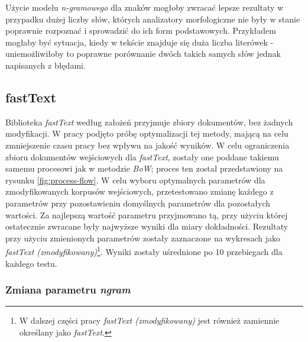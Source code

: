 Użycie modelu \textit{n-gramowego} dla znaków mogłoby zwracać lepsze rezultaty w przypadku dużej liczby słów, których analizatory morfologiczne nie były w stanie poprawnie rozpoznać i sprowadzić do ich form podstawowych. Przykładem mogłaby być sytuacja, kiedy w tekście znajduje się duża liczba literówek - uniemożliwiłoby to poprawne porównanie dwóch takich samych słów jednak napisanych z błędami.

\subsection{fastText}
Biblioteka \textit{fastText} według założeń przyjmuje zbiory dokumentów, bez żadnych modyfikacji. \cite{joulin2016fasttext} W pracy podjęto próbę optymalizacji tej metody, mającą na celu zmniejszenie czasu pracy bez wpływu na jakość wyników. W celu ograniczenia zbioru dokumentów wejściowych dla \textit{fastText}, zostały one poddane takiemu samemu procesowi jak w metodzie \textit{BoW}; proces ten został przedstawiony na rysunku \ref{fig:process-flow}. W celu wyboru optymalnych parametrów dla zmodyfikowanych korpusów wejściowych, przetestowano zmianę każdego z parametrów przy pozostawieniu domyślnych parametrów dla pozostałych wartości. Za najlepszą wartość parametru przyjmowano tą, przy użyciu której ostatecznie zwracane były najwyższe wyniki dla miary dokładności. Rezultaty przy użyciu zmienionych parametrów zostały zaznaczone na wykresach jako \textit{fastText (zmodyfikowany)}\footnote{W dalszej części pracy \textit{fastText (zmodyfikowany)} jest również zamiennie określany jako \textit{fastText}.}. Wyniki zostały uśrednione po 10 przebiegach dla każdego testu.


\subsubsection{Zmiana parametru \textit{ngram}}


